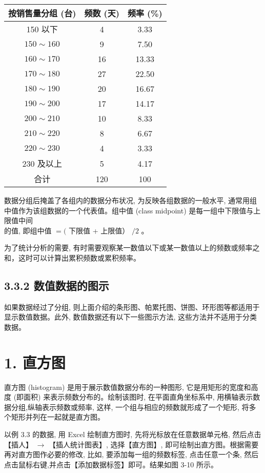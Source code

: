 \documentclass[10pt]{article}
\begin{document}
\begin{CJK*}{UTF8}{bsmi}
\begin{center}
\begin{tabular}{ccc}
\hline
按销售量分组 (台) & 频数 (天) & 频率 (\%) \\
\hline
150 以下 & 4 & 3.33 \\
$150 \sim 160$ & 9 & 7.50 \\
$160 \sim 170$ & 16 & 13.33 \\
$170 \sim 180$ & 27 & 22.50 \\
$180 \sim 190$ & 20 & 16.67 \\
$190 \sim 200$ & 17 & 14.17 \\
$200 \sim 210$ & 10 & 8.33 \\
$210 \sim 220$ & 8 & 6.67 \\
$220 \sim 230$ & 4 & 3.33 \\
230 及以上 & 5 & 4.17 \\
合计 & 120 & 100 \\
\hline
\end{tabular}
\end{center}

数据分组后掩盖了各组内的数据分布状况, 为反映各组数据的一般水平, 通常用组中值作为该组数据的一个代表值。组中值 (class midpoint) 是每一组中下限值与上限值中间\\
的值, 即组中值 $=($ 下限值 + 上限值） $/ 2$ 。

为了统计分析的需要, 有时需要观察某一数值以下或某一数值以上的频数或频率之和，这时可以计算出累积频数或累积频率。

\subsection*{3.3.2 数值数据的图示}
如果数据经过了分组, 则上面介绍的条形图、帕累托图、饼图、环形图等都适用于显示数值数据。此外, 数值数据还有以下一些图示方法, 这些方法并不适用于分类数据。

\section*{1. 直方图}
直方图 (histogram) 是用于展示数值数据分布的一种图形, 它是用矩形的宽度和高度 (即面积) 来表示频数分布的。绘制该图时, 在平面直角坐标系中, 用横轴表示数据分组,纵轴表示频数或频率, 这样, 一个组与相应的频数就形成了一个矩形, 将多个矩形并列在一起就是直方图。

以例 3.3 的数据, 用 Excel 绘制直方图时, 先将光标放在任意数据单元格, 然后点击【插人】 $\rightarrow$ 【插人统计图表】, 选择【直方图】, 即可绘制出直方图。根据需要再对直方图作必要的修改, 比如, 要添加每一组的频数标签, 点击任意一个条, 然后点击鼠标右键,并点击【添加数据标签】即可。结果如图 3-10 所示。


\end{CJK*}
\end{document}

